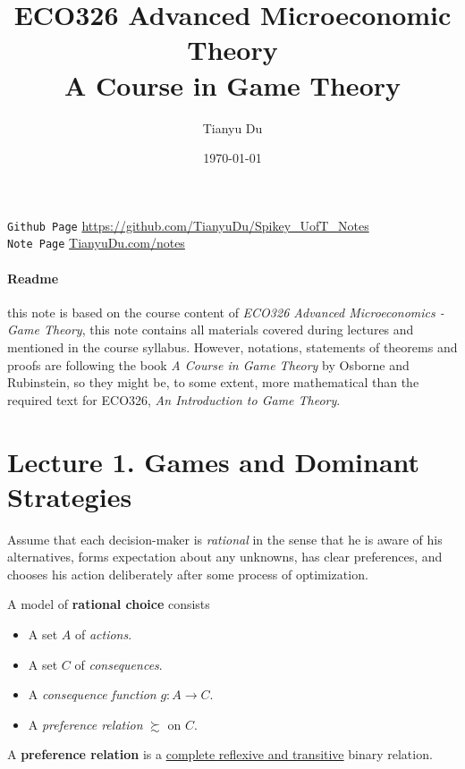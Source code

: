 \documentclass[11pt]{article}
\title{ECO326 Advanced Microeconomic Theory \\ \small A Course in Game Theory}
\author{Tianyu Du}
\date{\today}
\begin{document}
	\maketitle
	\doclicenseThis
	\texttt{Github Page} \url{https://github.com/TianyuDu/Spikey_UofT_Notes}\\
	\texttt{Note Page} \url{TianyuDu.com/notes}
	\paragraph{Readme} this note is based on the course content of \emph{ECO326 Advanced Microeconomics - Game Theory}, this note contains all materials covered during lectures and mentioned in the course syllabus. However, notations, statements of theorems and proofs are following the book \emph{A Course in Game Theory} by Osborne and Rubinstein, so they might be, to some extent, more mathematical than the required text for ECO326, \emph{An Introduction to Game Theory}.
	
	\tableofcontents
	\section{Lecture 1. Games and Dominant Strategies}
		\begin{assumption}[pg.4]
			Assume that each decision-maker is \emph{rational} in the sense that he is aware of his alternatives, forms expectation about any unknowns, has clear preferences, and chooses his action deliberately after some process of optimization.
		\end{assumption}
		
		\begin{definition}[pg.4]
			A model of \textbf{rational choice} consists
			\begin{itemize}
				\item A set $A$ of \emph{actions}.
				\item A set $C$ of \emph{consequences}.
				\item A \emph{consequence function} $g: A \to C$.
				\item A \emph{preference relation} $\succsim$ on $C$.
			\end{itemize}
		\end{definition}
		
		\begin{definition}[pg.7]
			A \textbf{preference relation} is a \ul{complete reflexive and transitive} binary relation.
		\end{definition}
		
\end{document}
